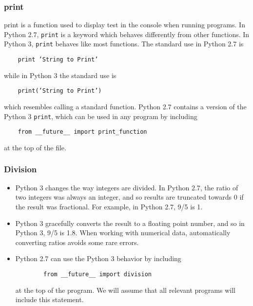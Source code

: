 \documentclass[Pydata.tex]{subfiles}
\begin{document}
\subsubsection*{print}
print is a function used to display test in the console when running programs. In Python 2.7, \texttt{print} is a
keyword which behaves differently from other functions. In Python 3, \texttt{print} behaves like most functions.
The standard use in Python 2.7 is
\begin{framed}
	\begin{verbatim}
	print ’String to Print’
	\end{verbatim}
\end{framed}
while in Python 3 the standard use is
\begin{framed}
	\begin{verbatim}
	print(’String to Print’)
	\end{verbatim}
\end{framed}
which resembles calling a standard function. Python 2.7 contains a version of the Python 3 \texttt{print}, which
can be used in any program by including
\begin{framed}
	\begin{verbatim}
	from __future__ import print_function
	\end{verbatim}
\end{framed}
at the top of the file. 
\subsubsection*{Division}
\begin{itemize}
	\item Python 3 changes the way integers are divided. In Python 2.7, the ratio of two integers was always an
	integer, and so results are truncated towards 0 if the result was fractional. For example, in Python 2.7, 9/5
	is 1. 
	\item Python 3 gracefully converts the result to a floating point number, and so in Python 3, 9/5 is 1.8. When
	working with numerical data, automatically converting ratios avoids some rare errors.
	\item Python 2.7 can use
	the Python 3 behavior by including
	\begin{framed}
		\begin{verbatim}
		from __future__ import division
		\end{verbatim}
	\end{framed}
	at the top of the program. We will assume that all relevant programs will include this statement.
\end{itemize}
\end{document}
